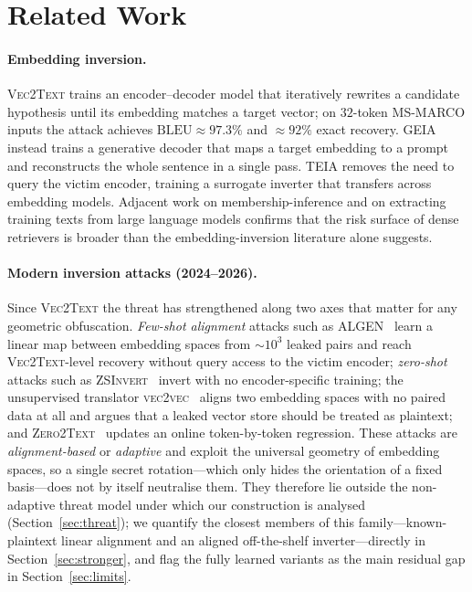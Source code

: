 \documentclass[11pt,a4paper]{article}
\begin{document}
\section{Related Work}\label{sec:related}

\paragraph{Embedding inversion.} \textsc{Vec2Text} \cite{ref_vec2text}
trains an encoder--decoder model that iteratively rewrites a candidate
hypothesis until its embedding matches a target vector; on
$32$-token \textsc{MS-MARCO} inputs the attack achieves
$\mathrm{BLEU} \approx 97.3\%$ and $\approx 92\%$ exact recovery.
\textsc{GEIA} \cite{ref_geia} instead trains a generative decoder that
maps a target embedding to a prompt and reconstructs the whole sentence
in a single pass. \textsc{TEIA} \cite{ref_teia} removes the need to query
the victim encoder, training a surrogate inverter that transfers across
embedding models. Adjacent work on
membership-inference \cite{ref_shokri} and on extracting training
texts from large language models \cite{ref_carlini} confirms that the
risk surface of dense retrievers is broader than the embedding-inversion
literature alone suggests.

\paragraph{Modern inversion attacks (2024--2026).} Since \textsc{Vec2Text}
the threat has strengthened along two axes that matter for any geometric
obfuscation. \emph{Few-shot alignment} attacks such as
\textsc{ALGEN}~\cite{ref_algen} learn a linear map between embedding spaces
from $\sim\!10^{3}$ leaked pairs and reach \textsc{Vec2Text}-level recovery
without query access to the victim encoder; \emph{zero-shot} attacks such as
\textsc{ZSInvert}~\cite{ref_zsinvert} invert with no encoder-specific
training; the unsupervised translator \textsc{vec2vec}~\cite{ref_vec2vec}
aligns two embedding spaces with no paired data at all and argues that a
leaked vector store should be treated as plaintext; and
\textsc{Zero2Text}~\cite{ref_zero2text} updates an online token-by-token
regression. These attacks are \emph{alignment-based} or \emph{adaptive} and
exploit the universal geometry of embedding spaces, so a single secret
rotation---which only hides the orientation of a fixed basis---does not by
itself neutralise them. They therefore lie outside the non-adaptive threat
model under which our construction is analysed (Section~\ref{sec:threat});
we quantify the closest members of this family---known-plaintext linear
alignment and an aligned off-the-shelf inverter---directly in
Section~\ref{sec:stronger}, and flag the fully learned variants as the
main residual gap in Section~\ref{sec:limits}.
\end{document}
